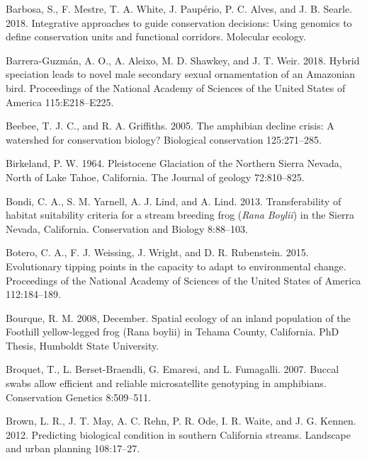 \documentclass[proquest,12pt,final]{ucthesis-CA2012} %
\begin{document}
\begin{ucmainmatter}
\leavevmode\hypertarget{ref-barbosa_integrative_2018}{}%
Barbosa, S., F. Mestre, T. A. White, J. Paupério, P. C. Alves, and J. B.
Searle. 2018. Integrative approaches to guide conservation decisions:
Using genomics to define conservation units and functional corridors.
Molecular ecology.

\leavevmode\hypertarget{ref-barrera-guzman_hybrid_2018}{}%
Barrera-Guzmán, A. O., A. Aleixo, M. D. Shawkey, and J. T. Weir. 2018.
Hybrid speciation leads to novel male secondary sexual ornamentation of
an Amazonian bird. Proceedings of the National Academy of Sciences of
the United States of America 115:E218--E225.

\leavevmode\hypertarget{ref-beebee_amphibian_2005}{}%
Beebee, T. J. C., and R. A. Griffiths. 2005. The amphibian decline
crisis: A watershed for conservation biology? Biological conservation
125:271--285.

\leavevmode\hypertarget{ref-birkeland_pleistocene_1964}{}%
Birkeland, P. W. 1964. Pleistocene Glaciation of the Northern Sierra
Nevada, North of Lake Tahoe, California. The Journal of geology
72:810--825.

\leavevmode\hypertarget{ref-bondi_transferability_2013}{}%
Bondi, C. A., S. M. Yarnell, A. J. Lind, and A. Lind. 2013.
Transferability of habitat suitability criteria for a stream breeding
frog (\emph{Rana} \emph{Boylii}) in the Sierra Nevada, California.
Conservation and Biology 8:88--103.

\leavevmode\hypertarget{ref-botero_evolutionary_2015}{}%
Botero, C. A., F. J. Weissing, J. Wright, and D. R. Rubenstein. 2015.
Evolutionary tipping points in the capacity to adapt to environmental
change. Proceedings of the National Academy of Sciences of the United
States of America 112:184--189.

\leavevmode\hypertarget{ref-bourque_spatial_2008}{}%
Bourque, R. M. 2008, December. Spatial ecology of an inland population
of the Foothill yellow-legged frog (Rana boylii) in Tehama County,
California. PhD Thesis, Humboldt State University.

\leavevmode\hypertarget{ref-broquet_buccal_2007}{}%
Broquet, T., L. Berset-Braendli, G. Emaresi, and L. Fumagalli. 2007.
Buccal swabs allow efficient and reliable microsatellite genotyping in
amphibians. Conservation Genetics 8:509--511.

\leavevmode\hypertarget{ref-brown_predicting_2012}{}%
Brown, L. R., J. T. May, A. C. Rehn, P. R. Ode, I. R. Waite, and J. G.
Kennen. 2012. Predicting biological condition in southern California
streams. Landscape and urban planning 108:17--27.


\end{ucmainmatter}
\end{document}
